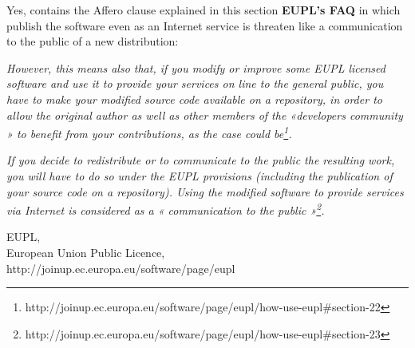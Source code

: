\documentclass[11pt]{scrartcl}
\begin{document}
\begin{enumerate}
		Yes, contains the Affero clause explained in this section \textbf{EUPL's FAQ} in which publish the software even as an Internet service is threaten like a communication to the public of a new distribution:
		
		\emph{However, this means also that, if you modify or improve some EUPL licensed software and use it to provide your services on line to the general public, you have to make your modified source code available on a repository, in order to allow the original author as well as other members of the «developers community » to benefit from your contributions, as the case could be\footnote{http://joinup.ec.europa.eu/software/page/eupl/how-use-eupl\#section-22}.}

		\emph{If you decide to redistribute or to communicate to the public the resulting work, you will have to do so under the EUPL provisions (including the publication of your source code on a repository). Using the modified software to provide services via Internet is considered as a « communication to the public »\footnote{http://joinup.ec.europa.eu/software/page/eupl/how-use-eupl\#section-23}.}
	
\end{enumerate}

\begin{thebibliography}{9}

		EUPL,\\
		European Union Public Licence,\\
		http://joinup.ec.europa.eu/software/page/eupl
		
\end{thebibliography}
\end{document}
